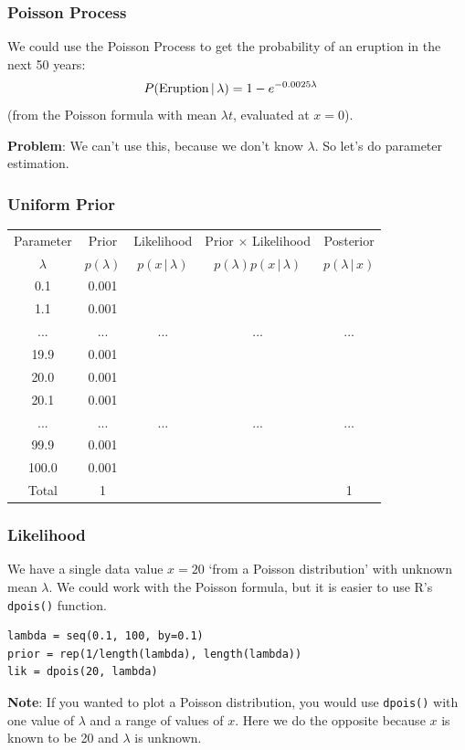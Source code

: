 \documentclass{beamer}
\newcommand{\given}{\,|\,}
\begin{document}
\begin{frame}
\frametitle{Poisson Process}
We could use the Poisson Process to get the probability
of an eruption in the next 50 years:
\begin{align}
P(\textnormal{Eruption} \given \lambda)
    &= 1 - e^{-0.0025\lambda}
\end{align}
(from the Poisson formula with mean $\lambda t$, evaluated at $x=0$).\\[1em]\pause

{\bf Problem}: We can't use this, because we don't know $\lambda$.
So let's do parameter estimation.


\end{frame}


\begin{frame}
\frametitle{Uniform Prior}

\centering
{\footnotesize
\begin{tabular}{|c|c|c|c|c|}
\hline
Parameter & Prior & Likelihood & Prior $\times$ Likelihood & Posterior \\
$\lambda$  & $p(\lambda)$ & $p(x \given \lambda)$ & $p(\lambda)p(x\given \lambda)$ & $p(\lambda\given x)$ \\
\hline
0.1 & 0.001 &  & & \\
1.1 & 0.001  &   & & \\
... &... &... & ...&... \\
19.9 & 0.001 &  & & \\
20.0 & 0.001  &  & & \\
20.1 & 0.001 &  & & \\
... &... &... & ...&... \\
99.9 & 0.001 &  & & \\
100.0   & 0.001 &  & & \\
\hline
Total & 1 & & & 1 \\
\hline
\end{tabular}
}

\end{frame}


\begin{frame}[fragile]
\frametitle{Likelihood}
We have a single data value $x=20$ `from a Poisson distribution' with unknown mean
$\lambda$. We could work with the Poisson formula, but it is easier to use
R's \texttt{dpois()} function.\pause

\begin{verbatim}
lambda = seq(0.1, 100, by=0.1)
prior = rep(1/length(lambda), length(lambda))
lik = dpois(20, lambda)
\end{verbatim}
\pause

{\bf Note}: If you wanted to plot a Poisson distribution, you would use
\texttt{dpois()} with one value of $\lambda$ and a range of values
of $x$. Here we do the opposite because $x$ is known to be 20 and
$\lambda$ is unknown.
\end{frame}
\end{document}
